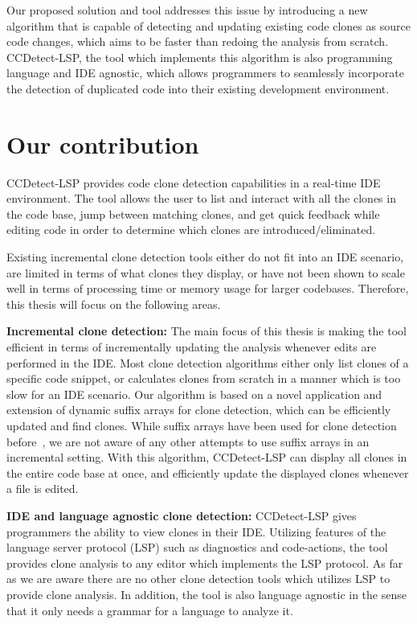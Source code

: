 Our proposed solution and tool addresses this issue by introducing a new algorithm that is
capable of detecting and updating existing code clones as source code changes, which aims
to be faster than redoing the analysis from scratch. CCDetect-LSP, the tool which
implements this algorithm is also programming language and IDE agnostic, which allows
programmers to seamlessly incorporate the detection of duplicated code into their existing
development environment.

\section{Our contribution}

CCDetect-LSP provides code clone detection capabilities in a real-time IDE environment.
The tool allows the user to list and interact with all the clones in the code base, jump
between matching clones, and get quick feedback while editing code in order to determine
which clones are introduced/eliminated.

Existing incremental clone detection tools either do not fit into an IDE scenario, are
limited in terms of what clones they display, or have not been shown to scale well in
terms of processing time or memory usage for larger codebases. Therefore, this thesis will
focus on the following areas.

\textbf{Incremental clone detection:} The main focus of this thesis is making the tool
efficient in terms of incrementally updating the analysis whenever edits are performed in
the IDE. Most clone detection algorithms either only list clones of a specific code
snippet, or calculates clones from scratch in a manner which is too slow for an IDE
scenario. Our algorithm is based on a novel application and extension of dynamic suffix
arrays for clone detection, which can be efficiently updated and find clones. While suffix
arrays have been used for clone detection before~\cite{SHINOBI}, we are not aware of any
other attempts to use suffix arrays in an incremental setting. With this algorithm,
CCDetect-LSP can display all clones in the entire code base at once, and efficiently
update the displayed clones whenever a file is edited.

\textbf{IDE and language agnostic clone detection:} CCDetect-LSP gives programmers the
ability to view clones in their IDE. Utilizing features of the language server protocol
(LSP) such as diagnostics and code-actions, the tool provides clone analysis to any editor
which implements the LSP protocol. As far as we are aware there are no other clone
detection tools which utilizes LSP to provide clone analysis. In addition, the tool is
also language agnostic in the sense that it only needs a grammar for a language to analyze
it. 

